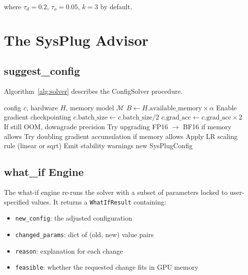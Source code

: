\documentclass[10pt,twocolumn]{article}
\begin{document}
where $\tau_d = 0.2$, $\tau_o = 0.05$, $k = 3$ by default.

\section{The SysPlug Advisor}

\subsection{suggest\_config}

Algorithm~\ref{alg:solver} describes the ConfigSolver procedure.

\begin{algorithm}[h]
\caption{ConfigSolver.solve}\label{alg:solver}
\begin{algorithmic}[1]
\Require config $c$, hardware $H$, memory model $\mathcal{M}$
\State $B \leftarrow H.\text{available\_memory} \times \alpha$ 
 
  \State Enable gradient checkpointing
    \State $c.\text{batch\_size} \leftarrow c.\text{batch\_size} / 2$
    \State $c.\text{grad\_acc} \leftarrow c.\text{grad\_acc} \times 2$
    \State If still OOM, downgrade precision
  \EndWhile
\EndIf
{} 
  \State Try upgrading FP16 $\to$ BF16 if memory allows
  \State Try doubling gradient accumulation if memory allows
\EndIf
\State Apply LR scaling rule (linear or sqrt)
\State Emit stability warnings
\State \Return new SysPlugConfig
\end{algorithmic}
\end{algorithm}

\subsection{what\_if Engine}

The what-if engine re-runs the solver with a subset of parameters locked to
user-specified values.  It returns a \texttt{WhatIfResult} containing:
\begin{itemize}
  \item \texttt{new\_config}: the adjusted configuration
  \item \texttt{changed\_params}: dict of (old, new) value pairs
  \item \texttt{reason}: explanation for each change
  \item \texttt{feasible}: whether the requested change fits in GPU memory
\end{itemize}
\end{document}
